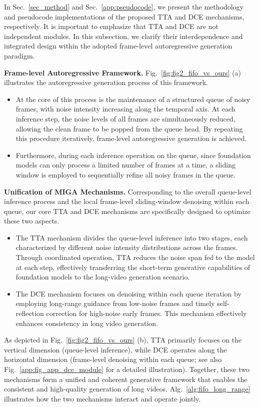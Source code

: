 \documentclass{article}
\theoremstyle{plain}
\theoremstyle{definition}
\theoremstyle{remark}
\begin{document}
In Sec.~\ref{sec_method} and Sec.~\ref{app:pseudocode}, we present the methodology and pseudocode implementations of the proposed TTA and DCE mechanisms, respectively. It is important to emphasize that TTA and DCE are not independent modules. In this subsection, we clarify their interdependence and integrated design within the adopted frame-level autoregressive generation paradigm.


\textbf{Frame-level Autoregressive Framework.}
Fig.~\ref{fig:fig2_fifo_vs_ours} (a) illustrates the autoregressive generation process of this framework.
\begin{itemize}
    \item At the core of this process is the maintenance of a structured queue of noisy frames, with noise intensity increasing along the temporal axis. At each inference step, the noise levels of all frames are simultaneously reduced, allowing the clean frame to be popped from the queue head. By repeating this procedure iteratively, frame-level autoregressive generation is achieved.
    \item Furthermore, during each inference operation on the queue, since foundation models can only process a limited number of frames at a time, a sliding window is employed to sequentially refine all noisy frames in the queue.
\end{itemize}


\textbf{Unification of MIGA Mechanisms.}
Corresponding to the overall queue-level inference process and the local frame-level sliding-window denoising within each queue, our core TTA and DCE mechanisms are specifically designed to optimize these two aspects.
\begin{itemize}
    \item The TTA mechanism divides the queue-level inference into two stages, each characterized by different noise intensity distributions across the frames. Through coordinated operation, TTA reduces the noise span fed to the model at each step, effectively transferring the short-term generative capabilities of foundation models to the long-video generation scenario.
    \item The DCE mechanism focuses on denoising within each queue iteration by employing long-range guidance from low-noise frames and timely self-reflection correction for high-noise early frames. This mechanism effectively enhances consistency in long video generation.
\end{itemize}


As depicted in Fig.~\ref{fig:fig2_fifo_vs_ours} (b), TTA primarily focuses on the vertical dimension (queue-level inference), while DCE operates along the horizontal dimension (frame-level denoising within each queue; see also Fig.~\ref{app:fig_app_dce_module} for a detailed illustration).
Together, these two mechanisms form a unified and coherent generative framework that enables the consistent and high-quality generation of long videos.  Alg.~\ref{alg:fifo_long_range} illustrates how the two mechanisms interact and operate jointly.
\end{document}
